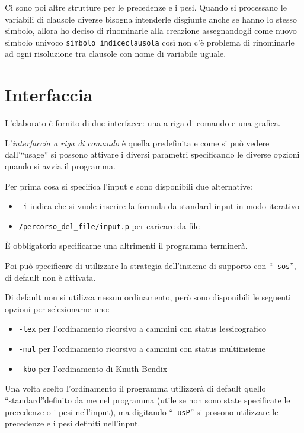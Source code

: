 \documentclass[a4paper,11pt]{article} %
\newcommand{\sintassi}{\texttt}
\begin{document}
Ci sono poi altre
strutture per le precedenze e i pesi. 
Quando si processano le variabili di clausole diverse bisogna intenderle disgiunte
anche se hanno lo stesso simbolo, allora ho deciso di rinominarle alla creazione 
assegnandogli come nuovo simbolo univoco 
\sintassi{simbolo\_indiceclausola} così non c'è problema di rinominarle ad ogni
risoluzione tra clausole con nome di variabile uguale.


\section{Interfaccia}\label{sec: interfaccia}
L'elaborato è fornito di due interfacce: una a 
{riga di comando} e una 
{grafica}.

L'\emph{interfaccia a riga di comando}
è quella predefinita e come si può vedere dall'``usage''
si possono attivare i diversi parametri specificando le diverse opzioni quando
si avvia il programma.

Per prima cosa si specifica l'input e sono disponibili due alternative:
\vspace{-1ex}
\begin{itemize}
  \item{\sintassi{-i}} indica che si vuole inserire la formula da standard input in modo iterativo
\vspace{-1ex}
  \item{\sintassi{/percorso\_del\_file/input.p}} per caricare da file
\end{itemize}
\vspace{-1ex}
\`E obbligatorio specificarne una altrimenti il programma terminerà.

Poi può specificare di utilizzare la strategia dell'insieme di supporto con 
``\sintassi{-sos}'', di default non è attivata.

Di default non si utilizza nessun ordinamento, però sono disponibili le seguenti 
opzioni per selezionarne uno:
\vspace{-1ex}
\begin{itemize}
  \item{\sintassi{-lex}} per l'ordinamento ricorsivo a cammini con status lessicografico
\vspace{-1ex}
  \item{\sintassi{-mul}} per l'ordinamento ricorsivo a cammini con status multiinsieme
\vspace{-1ex}
  \item{\sintassi{-kbo}} per l'ordinamento di Knuth-Bendix
\end{itemize}
\vspace{-1ex}
Una volta scelto l'ordinamento il programma utilizzerà di default quello 
``standard''definito da me nel programma
(utile se non sono state specificate le precedenze o i pesi nell'input),
ma digitando ``\sintassi{-usP}'' si possono utilizzare le precedenze e i pesi definiti 
nell'input.
\end{document}
